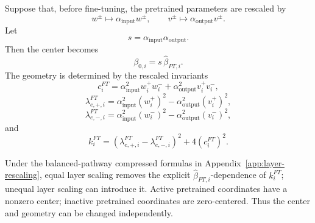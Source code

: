 \documentclass[11pt]{article}
\begin{document}
Suppose that, before fine-tuning, the pretrained parameters are rescaled by
\begin{equation}
    w^\pm\mapsto \alpha_{\mathrm{input}}w^\pm,
    \qquad
    v^\pm\mapsto \alpha_{\mathrm{output}}v^\pm.
\end{equation}
Let
\begin{equation}
    s=\alpha_{\mathrm{input}}\alpha_{\mathrm{output}}.
\end{equation}
Then the center becomes
\begin{equation}
    \beta_{0,i}=s\,\widehat\beta_{PT,i}.
\end{equation}
The geometry is determined by the rescaled invariants
\begin{equation}
    c_i^{FT}
    =
    \alpha_{\mathrm{input}}^2w_i^+w_i^-
    +
    \alpha_{\mathrm{output}}^2v_i^+v_i^-,
\end{equation}
\begin{equation}
    \lambda_{e,+,i}^{FT}
    =
    \alpha_{\mathrm{input}}^2(w_i^+)^2
    -
    \alpha_{\mathrm{output}}^2(v_i^+)^2,
\end{equation}
\begin{equation}
    \lambda_{e,-,i}^{FT}
    =
    \alpha_{\mathrm{input}}^2(w_i^-)^2
    -
    \alpha_{\mathrm{output}}^2(v_i^-)^2,
\end{equation}
and
\begin{equation}
    k_i^{FT}
    =
    (\lambda_{e,+,i}^{FT}-\lambda_{e,-,i}^{FT})^2
    +
    4(c_i^{FT})^2.
\end{equation}

Under the balanced-pathway compressed formulas in Appendix~\ref{app:layer-rescaling}, equal layer scaling removes the explicit \(\widehat\beta_{PT,i}\)-dependence of \(k_i^{FT}\); unequal layer scaling can introduce it. Active pretrained coordinates have a nonzero center; inactive pretrained coordinates are zero-centered. Thus the center and geometry can be changed independently.
\end{document}
